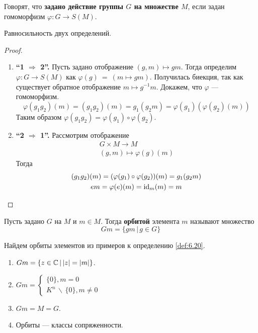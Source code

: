\documentclass[../main.tex]{subfiles}
\begin{document}
\begin{definition}
\label{def:6.21}
  Говорят, что \textbf{задано действие группы $G$ на множестве $M$}, если задан гомоморфизм $\varphi\colon G \to S(M)$.
\end{definition}
\begin{theorem-non}
  Равносильность двух определений.
\end{theorem-non}
\begin{proof}
  \begin{enumerate}
    \item \textbf{``1 $\Rightarrow$ 2''.} Пусть задано отображение $(g, m) \mapsto gm$. Тогда определим $\varphi\colon G \to S(M)$ как $\varphi(g)~=~(m \mapsto gm)$. Получилась биекция, так как существует обратное отображение $m \mapsto g^{-1}m$. Докажем, что $\varphi$ --- гомоморфизм.
    \begin{equation*}
      \varphi(g_1g_2)(m) = (g_1g_2)(m) = g_1(g_2m) = \varphi(g_1)(\varphi(g_2)(m))
    \end{equation*}
    Таким образом $\varphi(g_1g_2) = \varphi(g_1) \circ \varphi(g_2)$.
    \item \textbf{``2 $\Rightarrow$ 1''.}
    Рассмотрим отображение
    \begin{equation*}
      \begin{gathered}
        G \times M \to M \\
        (g, m) \mapsto \varphi(g)(m)
      \end{gathered}
    \end{equation*}
    Тогда
    \begin{equation*}
      \begin{gathered}
        (g_1g_2)(m) = (\varphi(g_1) \circ \varphi(g_2))(m) = g_1(g_2m) \\
        em = \varphi(e)(m) = \operatorname{id}_m(m) = m
      \end{gathered}
    \end{equation*}
  \end{enumerate}
\end{proof}

\begin{definition}
  Пусть задано $G$ на $M$ и $m \in M$. Тогда \textbf{орбитой} элемента $m$ называют множество
  \begin{equation*}
    Gm = \{gm \, | \, g \in G\}
  \end{equation*}
\end{definition}

\begin{examples}
  Найдем орбиты элементов из примеров к определению \ref{def:6.20}.
  \begin{enumerate}
    \item $Gm = \{z \in \mathbb{C} \, | \, |z| = |m|\}$.
    \item $Gm =
    \begin{cases}
      \{0\}, m = 0 \\
      K^n \, \backslash\, \{0\}, m \neq 0
    \end{cases}$
    \item $Gm = M = G$.
    \item Орбиты --- классы сопряженности.
  \end{enumerate}
\end{examples}
\end{document}
